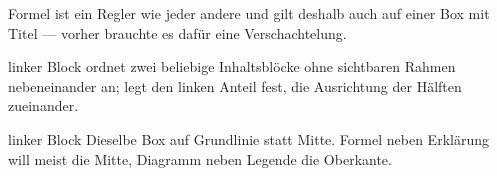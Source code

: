 \begin{figbox}
\end{figbox}

\begin{defbox}
  \centering Formel
  \tcblower
   ist ein Regler wie jeder andere und gilt deshalb auch
  auf einer Box mit Titel — vorher brauchte es dafür eine Verschachtelung.
\end{defbox}

\begin{splitbox}[split=0.34, splitalign=center]
  \centering linker Block
  \tcblower
   ordnet zwei beliebige Inhaltsblöcke ohne sichtbaren
  Rahmen nebeneinander an;  legt den linken Anteil fest,
   die Ausrichtung der Hälften zueinander.
\end{splitbox}

\begin{splitbox}[split=0.34, splitalign=bottom]
  \centering linker Block
  \tcblower
  Dieselbe Box auf Grundlinie statt Mitte. Formel neben Erklärung will meist
  die Mitte, Diagramm neben Legende die Oberkante.
\end{splitbox}
